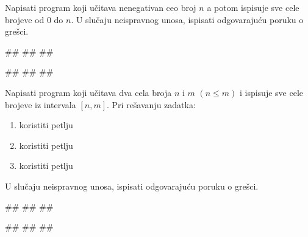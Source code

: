 \begin{Exercise}[label=PET_03] 
Napisati program koji učitava nenegativan ceo broj $n$
a potom ispisuje sve cele brojeve od $0$ do $n$. 
U slučaju neispravnog unosa, ispisati odgovarajuću poruku o grešci. 


\begin{miditest}
\begin{upotreba}{1}
#\naslovInt#
##
##
\end{upotreba}
\end{miditest}
\begin{miditest}
\begin{upotreba}{2}
#\naslovInt#
##
##
\end{upotreba}
\end{miditest}
\end{Exercise}
\ifresenja
\begin{Answer}[ref=PET_03]
\end{Answer}
\fi


\begin{Exercise}[label=PET_04] 
Napisati program koji učitava dva cela broja $n$ i $m$ $(n \leq m)$ i ispisuje sve
cele brojeve iz intervala $[n,m]$. Pri rešavanju zadatka: 
\begin{enumerate}
\setlength\itemsep{0em}
\item koristiti  petlju
\item koristiti  petlju
\item koristiti  petlju
 \end{enumerate}
U slučaju neispravnog unosa, ispisati odgovarajuću poruku o grešci. 


\begin{miditest}
\begin{upotreba}{1}
#\naslovInt#
##
##
\end{upotreba}
\end{miditest}
\begin{miditest}
\begin{upotreba}{2}
#\naslovInt#
##
##
\end{upotreba}
\end{miditest}
\end{Exercise}
\ifresenja
\begin{Answer}[ref=PET_04]
\end{Answer}
\fi

